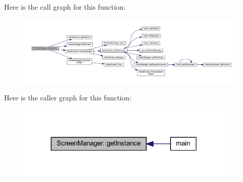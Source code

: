Here is the call graph for this function\-:\nopagebreak
\begin{figure}[H]
\begin{center}
\leavevmode
\includegraphics[width=350pt]{class_screen_manager_ad4281372c025d4c80696299b0e8a1fbd_cgraph}
\end{center}
\end{figure}




Here is the caller graph for this function\-:\nopagebreak
\begin{figure}[H]
\begin{center}
\leavevmode
\includegraphics[width=295pt]{class_screen_manager_ad4281372c025d4c80696299b0e8a1fbd_icgraph}
\end{center}
\end{figure}


